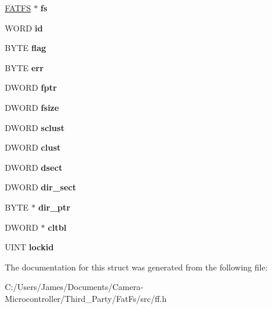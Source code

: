 \begin{DoxyCompactItemize}
\begin{tabbing}
\end{tabbing}\item 
\mbox{\label{struct_f_i_l_ae363a794e38f3a9aa1d55b8e3c7fcee7}} 
\hyperlink{struct_f_a_t_f_s}{F\+A\+T\+FS} $\ast$ {\bfseries fs}
\item 
\mbox{\label{struct_f_i_l_a7b7a6396b2c82ad46c6d8b2bf141a8dd}} 
W\+O\+RD {\bfseries id}
\item 
\mbox{\label{struct_f_i_l_abb2c49aaa8df55e1e1d8cb0c5e04a3bf}} 
B\+Y\+TE {\bfseries flag}
\item 
\mbox{\label{struct_f_i_l_a32b2a186af2cab58af8114c05386b9f6}} 
B\+Y\+TE {\bfseries err}
\item 
\mbox{\label{struct_f_i_l_a0f65af32a2d036c560e66177961b9b22}} 
D\+W\+O\+RD {\bfseries fptr}
\item 
\mbox{\label{struct_f_i_l_af70a0afd16367837984d6205cbfca308}} 
D\+W\+O\+RD {\bfseries fsize}
\item 
\mbox{\label{struct_f_i_l_ad5d52f3fde971d2a05ff777a6243c252}} 
D\+W\+O\+RD {\bfseries sclust}
\item 
\mbox{\label{struct_f_i_l_ac134c1b4645be670eb5207032e714616}} 
D\+W\+O\+RD {\bfseries clust}
\item 
\mbox{\label{struct_f_i_l_a272171f74215002aba31a89428f1d290}} 
D\+W\+O\+RD {\bfseries dsect}
\item 
\mbox{\label{struct_f_i_l_a5e11faf537370889c867127205f26ad1}} 
D\+W\+O\+RD {\bfseries dir\+\_\+sect}
\item 
\mbox{\label{struct_f_i_l_a0071755a7d2cacd3bafbb1bf2dab98a0}} 
B\+Y\+TE $\ast$ {\bfseries dir\+\_\+ptr}
\item 
\mbox{\label{struct_f_i_l_a807e335a4d92639456ac4273cb0de4cb}} 
D\+W\+O\+RD $\ast$ {\bfseries cltbl}
\item 
\mbox{\label{struct_f_i_l_a1a3f468bbdddeae5d029fa73d512b0df}} 
U\+I\+NT {\bfseries lockid}
\end{DoxyCompactItemize}


The documentation for this struct was generated from the following file\+:\begin{DoxyCompactItemize}
\item 
C\+:/\+Users/\+James/\+Documents/\+Camera-\/\+Microcontroller/\+Third\+\_\+\+Party/\+Fat\+Fs/src/ff.\+h\end{DoxyCompactItemize}
